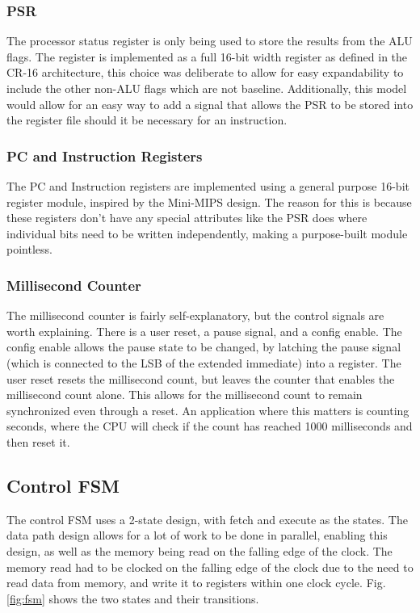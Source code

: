 \documentclass[10pt, portrait, letterpaper]{article}
\begin{document}
  \subsubsection{PSR} 
  The processor status register is only being used to store the results from the 
  ALU flags. 
  The register is implemented as a full 16-bit width register as defined 
  in the CR-16 architecture, this choice was deliberate to allow for easy 
  expandability to include the other non-ALU flags which are not baseline. 
  Additionally, this model would allow for an easy way to add a signal that allows 
  the PSR to be stored into the register file should it be necessary for an instruction.

  \subsubsection{PC and Instruction Registers}
  The PC and Instruction registers are implemented using a general purpose 
  16-bit register module, inspired by the Mini-MIPS design. 
  The reason for this is because these registers don't have any special 
  attributes like the PSR does where individual bits need to be written 
  independently, making a purpose-built module pointless.

  \subsubsection{Millisecond Counter}
  The millisecond counter is fairly self-explanatory, but the control signals are 
  worth explaining.
  There is a user reset, a pause signal, and a 
  config enable. 
  The config enable allows the pause state to be changed, by latching the pause 
  signal (which is connected to the LSB of the extended immediate) into a 
  register. 
  The user reset resets the millisecond count, but leaves the counter that enables 
  the millisecond count alone. 
  This allows for the millisecond count to remain synchronized even through a reset. 
  An application where this matters is counting seconds, where the CPU will check if 
  the count has reached 1000 milliseconds and then reset it. 


  \subsection{Control FSM}
  The control FSM uses a 2-state design, with fetch and execute as the states. 
  The data path design allows for a lot of work to be done in parallel, enabling this design, as well as the memory being read on the falling edge of the clock. 
  The memory read had to be clocked on the falling edge of the clock due to the need to read data from memory, and write it to registers within one clock cycle.
  Fig. \ref{fig:fsm} shows the two states and their transitions.
\end{document}
